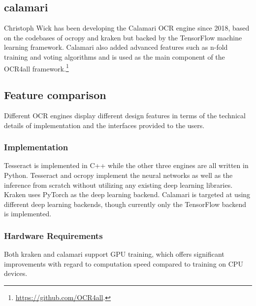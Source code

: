 \documentclass[sigconf]{acmart}
\begin{document}
\subsection{calamari}

Christoph Wick has been developing the Calamari
\cite{DBLP:journals/corr/abs-1807-02004} OCR engine since 2018, based on the
codebases of ocropy and kraken but backed by the TensorFlow machine learning
framework. Calamari also added advanced features such as n-fold training and
voting algorithms \cite{wickcomparison} and is used as the main component of the OCR4all
framework.\footnote{\url{https://github.com/OCR4all}.}

\subsection{Feature comparison}


Different OCR engines display different design features in terms of the
technical details of implementation and the interfaces provided to the users.

\subsubsection{Implementation}

Tesseract is implemented in C++ while the
other three engines are all written in Python. Tesseract and ocropy
implement the neural networks as well as the inference from scratch without
utilizing any existing deep learning libraries. Kraken uses PyTorch as the
deep learning backend. Calamari is targeted at using different deep learning backends,
though currently only the TensorFlow backend is implemented.


\subsubsection{Hardware Requirements}

Both kraken and calamari support GPU training, which offers significant
improvements with regard to computation speed compared to training on CPU devices.

\end{document}
